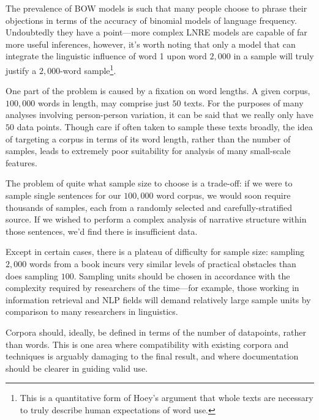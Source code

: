 The prevalence of BOW models is such that many people choose to phrase their objections in terms of the accuracy of binomial models of language frequency\cite{kilgarriff2005language,evert2004simple,evert2007zipfr}.  Undoubtedly they have a point---more complex LNRE models are capable of far more useful inferences, however, it's worth noting that only a model that can integrate the linguistic influence of word 1 upon word $2,000$ in a sample will truly justify a $2,000$-word sample\footnote{This is a quantitative form of Hoey's argument that whole texts are necessary to truly describe human expectations of word use.}.


One part of the problem is caused by a fixation on word lengths. A given corpus, $100,000$ words in length, may comprise just $50$ texts. For the purposes of many analyses involving person-person variation, it can be said that we really only have $50$ data points. Though care if often taken to sample these texts broadly, the idea of targeting a corpus in terms of its word length, rather than the number of samples, leads to extremely poor suitability for analysis of many small-scale features.

The problem of quite what sample size to choose is a trade-off: if we were to sample single sentences for our $100,000$ word corpus, we would soon require thousands of samples, each from a randomly selected and carefully-stratified source. If we wished to perform a complex analysis of narrative structure within those sentences, we'd find there is insufficient data.

Except in certain cases, there is a plateau of difficulty for sample size: sampling $2,000$ words from a book incurs very similar levels of practical obstacles than does sampling $100$. Sampling units should be chosen in accordance with the complexity required by researchers of the time---for example, those working in information retrieval and NLP fields will demand relatively large sample units by comparison to many researchers in linguistics.

Corpora should, ideally, be defined in terms of the number of datapoints, rather than words.  This is one area where compatibility with existing corpora and techniques is arguably damaging to the final result, and where documentation should be clearer in guiding valid use.















